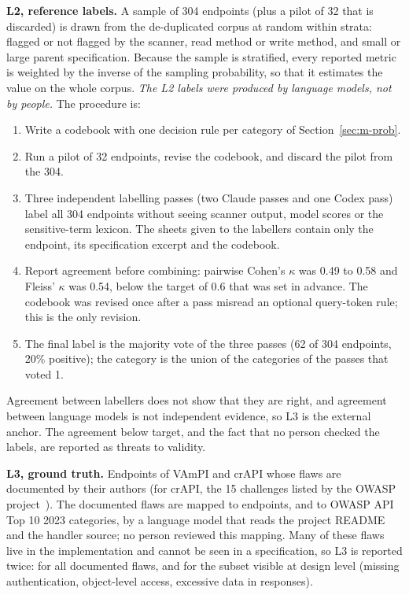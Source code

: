 \documentclass[conference]{IEEEtran}
\begin{document}
\textbf{L2, reference labels.} A sample of 304 endpoints (plus a pilot of 32 that is
discarded) is drawn from the de-duplicated corpus at random within strata: flagged or not
flagged by the scanner, read method or write method, and small or large parent specification.
Because the sample is stratified, every reported metric is weighted by the inverse of the
sampling probability, so that it estimates the value on the whole corpus. \emph{The L2 labels
were produced by language models, not by people.} The procedure is:
\begin{enumerate}
\item Write a codebook with one decision rule per category of Section~\ref{sec:m-prob}.
\item Run a pilot of 32 endpoints, revise the codebook, and discard the pilot from the 304.
\item Three independent labelling passes (two Claude passes and one Codex pass) label all 304
endpoints without seeing scanner output, model scores or the sensitive-term lexicon. The
sheets given to the labellers contain only the endpoint, its specification excerpt and the codebook.
\item Report agreement before combining: pairwise Cohen's $\kappa$ was 0.49 to 0.58 and
Fleiss' $\kappa$ was 0.54, below the target of 0.6 that was set in advance. The codebook was
revised once after a pass misread an optional query-token rule; this is the only revision.
\item The final label is the majority vote of the three passes (62 of 304 endpoints, 20\%
positive); the category is the union of the categories of the passes that voted 1.
\end{enumerate}
Agreement between labellers does not show that they are right, and agreement between language
models is not independent evidence, so L3 is the external anchor. The agreement below target,
and the fact that no person checked the labels, are reported as threats to validity.

\textbf{L3, ground truth.} Endpoints of VAmPI and crAPI whose flaws are documented by their
authors (for crAPI, the 15 challenges listed by the OWASP project~\cite{crapichallenges}). The documented flaws are mapped to endpoints, and to OWASP API Top 10 2023 categories, by a language model that reads the project README and the handler source; no person reviewed this mapping. Many of these flaws live in the implementation and cannot be seen in a specification,
so L3 is reported twice: for all documented flaws, and for the subset visible at design level
(missing authentication, object-level access, excessive data in responses).
\end{document}

